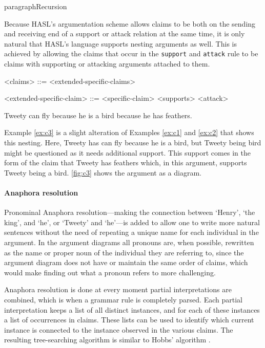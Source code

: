 paragraph{Recursion}

Because HASL's argumentation scheme allows claims to be both on the sending and receiving end of a support or attack relation at the same time, it is only natural that HASL's language supports nesting arguments as well. This is achieved by allowing the claims that occur in the \texttt{support} and \texttt{attack} rule to be claims with supporting or attacking arguments attached to them.

\begin{grammar}

<claims> ::= <extended-specific-claims>

<extended-specific-claim> ::= <specific-claim> <supports> <attack>

\end{grammar}

\begin{exe}
	\ex\label{ex:c3} Tweety can fly because he is a bird because he has feathers.
\end{exe}

\noindent Example \ref{ex:c3} is a slight alteration of Examples \ref{ex:c1} and \ref{ex:c2} that shows this nesting. Here, Tweety has can fly because he is a bird, but Tweety being bird might be questioned as it needs additional support. This support comes in the form of the claim that Tweety has feathers which, in this argument, supports Tweety being a bird. \autoref{fig:c3} shows the argument as a diagram.

\paragraph{Anaphora resolution}
Pronominal Anaphora resolution---making the connection between `Henry', `the king', and `he', or `Tweety' and `he'---is added to allow one to write more natural sentences without the need of repeating a unique name for each individual in the argument. In the argument diagrams all pronouns are, when possible, rewritten as the name or proper noun of the individual they are referring to, since the argument diagram does not have or maintain the same order of claims, which would make finding out what a pronoun refers to more challenging.

Anaphora resolution is done at every moment partial interpretations are combined, which is when a grammar rule is completely parsed. Each partial interpretation keeps a list of all distinct instances, and for each of these instances a list of occurrences in claims. These lists can be used to identify which current instance is connected to the instance observed in the various claims. The resulting tree-searching algorithm is similar to Hobbs' algorithm \cite{hobbs1978}.


